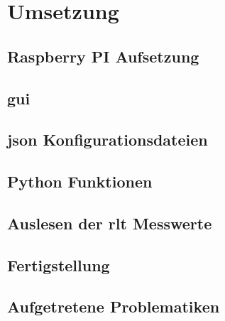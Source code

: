 \chapter{Umsetzung} 

\section{Raspberry PI Aufsetzung}
\setAuthor{\pezze}


\section{\acf{gui}}\label{gui_design}
\setAuthor{\pezze}



\section{\acs{json} Konfigurationsdateien}
\setAuthor{\pezze}



\setAuthor{\schneider}


\section{Python Funktionen}
\setAuthor{\pezze}


\section{Auslesen der \acs{rlt} Messwerte}
\setAuthor{\schneider}


\section{Fertigstellung}
\setAuthor{\schneider}


\setAuthor{\pezze}



\newpage
\section{Aufgetretene Problematiken}
\setAuthor{\mangeng}

